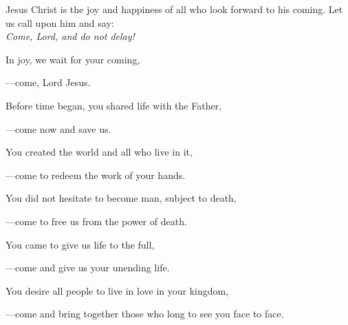 \intercessions\indent

\begin{hangpar}

Jesus Christ is the joy and happiness of all who look forward to his coming. Let us call upon him and say:\\
\emph{Come, Lord, and do not delay!}

\medskip In joy, we wait for your coming,

{\color{red}---\thinspace}come, Lord Jesus.

\medskip Before time began, you shared life with the Father,

{\color{red}---\thinspace}come now and save us.

\medskip You created the world and all who live in it,

{\color{red}---\thinspace}come to redeem the work of your hands.

\medskip You did not hesitate to become man, subject to death,

{\color{red}---\thinspace}come to free us from the power of death.

\medskip You came to give us life to the full,

{\color{red}---\thinspace}come and give us your unending life.

\medskip You desire all people to live in love in your kingdom,

{\color{red}---\thinspace}come and bring together those who long to see you face to face.

\medskip

\end{hangpar}